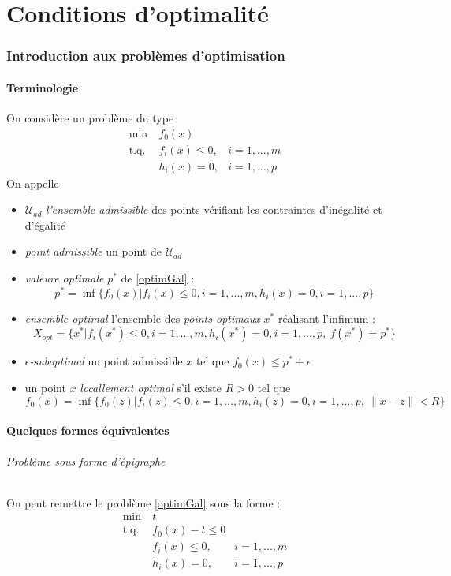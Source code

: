 \part{Conditions d'optimalité}
\section{Introduction aux problèmes d'optimisation}
\subsection{Terminologie}
On considère un problème du type
\begin{equation}\label{optimGal}
\begin{aligned}
	\min\ & f_0(x)\\
	\text{t.q. } & f_i(x)\leq 0,& i=1,...,m\\
			& h_i(x)=0,& i=1,...,p 
\end{aligned}
\end{equation}
On appelle 
\begin{itemize}
	\item $\mathcal{U}_{ad}$ \textit{l'ensemble admissible} des points vérifiant les contraintes d'inégalité et d'égalité
	\item \textit{point admissible} un point de $\mathcal{U}_{ad}$
	\item \textit{valeure optimale} $p^*$ de \eqref{optimGal} : \[p^*=\inf\{f_0(x) | f_i(x)\leq 0, i=1,...,m, h_i(x)=0, i=1,...,p\}\]
	\item \textit{ensemble optimal} l'ensemble des \textit{points optimaux} $x^*$ réalisant l'infimum : \[X_{opt}=\{x^* | f_i(x^*)\leq 0, i=1,...,m, h_i(x^*)=0, i=1,...,p,\ f(x^*)=p^*\}\]
	\item \textit{$\epsilon$-suboptimal} un point admissible $x$ tel que $f_0(x)\leq p^*+\epsilon$
	\item un point $x$ \textit{locallement optimal} s'il existe $R>0$ tel que \[f_0(x)=\inf\{f_0(z) | f_i(z)\leq 0, i=1,...,m, h_i(z)=0, i=1,...,p,\ \|x-z\|<R\}\]
\end{itemize} 

\subsection{Quelques formes équivalentes}
\paragraph{Problème sous forme d'épigraphe}
On peut remettre le problème \eqref{optimGal} sous la forme :
\[\begin{aligned}
	\min\ & t\\
	\text{t.q. } & f_0(x)-t\leq 0\\
			&f_i(x)\leq 0,& i=1,...,m\\
			& h_i(x)=0,& i=1,...,p 
\end{aligned}\]

